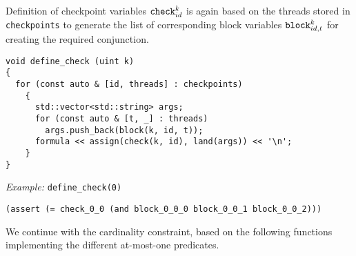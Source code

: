 \noindent
Definition of checkpoint variables $\texttt{check}^k_{id}$ is again based on the threads stored in \texttt{checkpoints} to generate the list of corresponding block variables $\texttt{block}^k_{id, t}$ for creating the required conjunction.

\begin{lstlisting}[style=c++]
void define_check (uint k)
{
  for (const auto & [id, threads] : checkpoints)
    {
      std::vector<std::string> args;
      for (const auto & [t, _] : threads)
        args.push_back(block(k, id, t));
      formula << assign(check(k, id), land(args)) << '\n';
    }
}
\end{lstlisting}


\noindent
\emph{Example:} \lstinline[style=c++]{define_check(0)}

\begin{lstlisting}[language=SMTLib]
(assert (= check_0_0 (and block_0_0_0 block_0_0_1 block_0_0_2)))
\end{lstlisting}


%
%

\noindent
We continue with the cardinality constraint, based on the following functions implementing the different at-most-one predicates.

